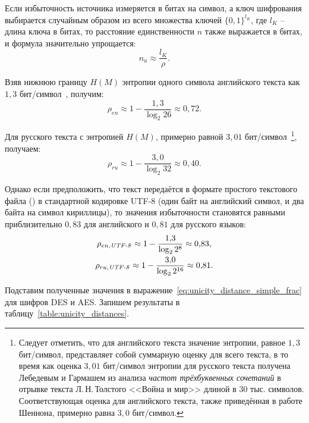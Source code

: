 Если избыточность источника измеряется в битах на символ, а ключ шифрования выбирается случайным образом из всего множества ключей $\{0, 1\}^{l_K}$, где $l_K$ -- длина ключа в битах, то расстояние единственности $n$ также выражается в битах, и формула значительно упрощается:
\begin{equation}\label{eq:unicity_distance_simple_frac}
n_u \approx \frac{l_K}{\rho}.
\end{equation}

Взяв нижнюю границу $H(M)$ энтропии одного символа английского текста как $1{,}3$ бит/символ~\cite{Shannon:1951, Schneier:2002}, получим:
	\[ \rho _{en} \approx 1 - \frac{ 1{,}3 }{ \log _2 {26} } \approx 0{,}72.\]

Для русского текста с энтропией $H(M)$, примерно равной $3{,}01$ бит/символ~\cite{Lebedev:1958}\footnote{Следует отметить, что для английского текста значение энтропии, равное $1{,}3$ бит/символ, представляет собой суммарную оценку для всего текста, в то время как оценка $3{,}01$ бит/символ энтропии для русского текста получена Лебедевым и Гармашем из анализа \emph{частот трёхбуквенных сочетаний} в отрывке текста Л.\,Н.\,Толстого <<Война и мир>> длиной в 30 тыс. символов. Соответствующая оценка для английского текста, также приведённая в работе Шеннона, примерно равна $3{,}0$ бит/символ.}, получаем:
	\[ \rho _{ru} \approx 1 - \frac{ 3{,}0 }{ \log _2 {32} } \approx 0{,}40.\]

Однако если предположить, что текст передаётся в формате простого текстового файла () в стандартной кодировке UTF-8 (один байт на английский символ, и два байта на символ кириллицы), то значения избыточности становятся равными приблизительно $0{,}83$ для английского и $0{,}81$ для русского языков:
\begin{gather*}
\rho _{en, \text{\textit{UTF-8}}} \approx 1 - \frac{ 1{,}3 }{ \log _2 {2^{8}} } \approx 0{,}83,\\
\rho _{ru, \text{\textit{UTF-8}}} \approx 1 - \frac{ 3{,}0 }{ \log _2 {2^{16}} } \approx 0{,}81.
\end{gather*} 

Подставим полученные значения в выражение~\ref{eq:unicity_distance_simple_frac} для шифров DES и AES. Запишем результаты в таблицу~\ref{table:unicity_distances}.

